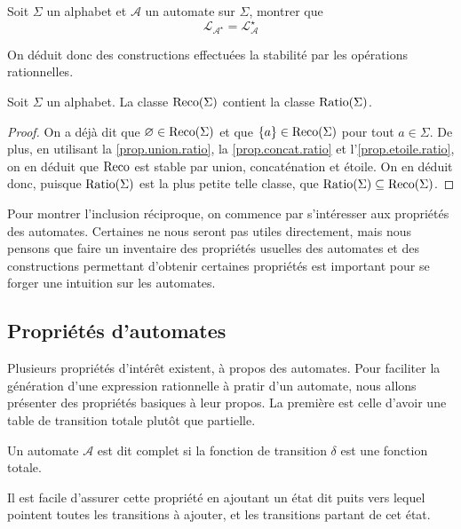 \begin{exercise}\label{prop.etoile.ratio}
  Soit $\Sigma$ un alphabet et $\mathcal A$ un automate sur $\Sigma$, montrer
  que
  \[\mathcal L_{\mathcal A^\star} = \mathcal L_{\mathcal A}^\star\]
\end{exercise}

On déduit donc des constructions effectuées la stabilité par les opérations
rationnelles.

\begin{corollary}
  Soit $\Sigma$ un alphabet. La classe $\operatorname{Reco}(\Sigma)$ contient la classe
  $\operatorname{Ratio}(\Sigma)$.
\end{corollary}

\begin{proof}
  On a déjà dit que $\varnothing \in \operatorname{Reco}(\Sigma)$ et que
  $\{a\}\in \operatorname{Reco}(\Sigma)$ pour tout $a \in \Sigma$. De plus, en utilisant la
  \cref{prop.union.ratio}, la \cref{prop.concat.ratio} et
  l'\cref{prop.etoile.ratio}, on en déduit que $\operatorname{Reco}$ est stable par union,
  concaténation et étoile. On en déduit donc, puisque $\operatorname{Ratio}(\Sigma)$ est la
  plus petite telle classe, que $\operatorname{Ratio}(\Sigma)\subseteq\operatorname{Reco}(\Sigma)$.
\end{proof}

Pour montrer l'inclusion réciproque, on commence par s'intéresser aux propriétés
des automates. Certaines ne nous seront pas utiles directement, mais nous
pensons que faire un inventaire des propriétés usuelles des automates et des
constructions permettant d'obtenir certaines propriétés est important pour se
forger une intuition sur les automates.

\subsection{Propriétés d'automates}

Plusieurs propriétés d'intérêt existent, à propos des automates. Pour faciliter
la génération d'une expression rationnelle à pratir d'un automate, nous allons
présenter des propriétés basiques à leur propos. La première est celle
d'avoir une table de transition totale plutôt que partielle.

\begin{definition}
  Un automate $\mathcal A$ est dit complet si la fonction de transition $\delta$
  est une fonction totale.
\end{definition}

Il est facile d'assurer cette propriété en ajoutant un état dit \og puits\fg
vers lequel pointent toutes les transitions à ajouter, et les transitions
partant de cet état.


